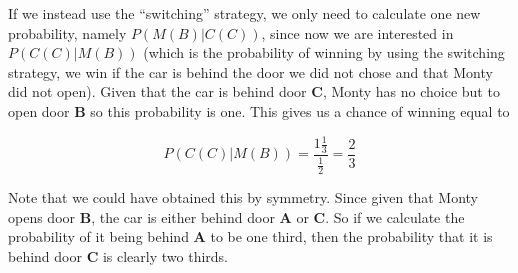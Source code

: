 \documentclass[]{article}
\begin{document}
If we instead use the ``switching'' strategy, we only need to calculate
one new probability, namely \(P(M(B)|C(C))\), since now we are
interested in \(P(C(C)|M(B))\) (which is the probability of winning by
using the switching strategy, we win if the car is behind the door we
did not chose and that Monty did not open). Given that the car is behind
door \textbf{C}, Monty has no choice but to open door \textbf{B} so this
probability is one. This gives us a chance of winning equal to

\[\begin{equation}
P(C(C)|M(B))=\frac{1\frac{1}{3}}{\frac{1}{2}}=\frac{2}{3}
\end{equation}\]

Note that we could have obtained this by symmetry. Since given that
Monty opens door \textbf{B}, the car is either behind door \textbf{A} or
\textbf{C}. So if we calculate the probability of it being behind
\textbf{A} to be one third, then the probability that it is behind door
\textbf{C} is clearly two thirds.
\end{document}
